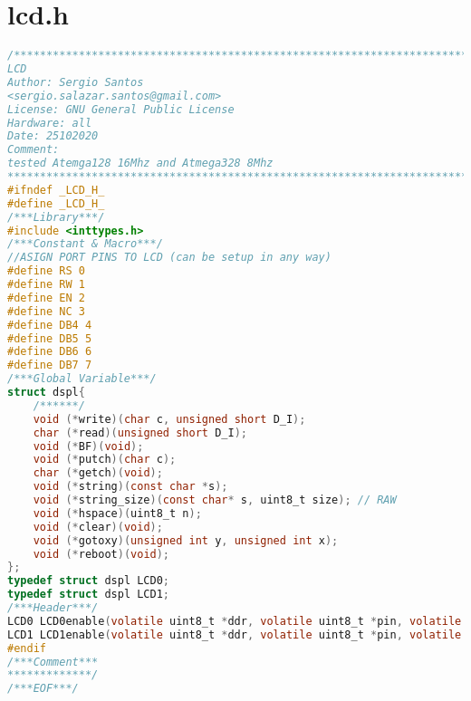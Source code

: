 \chapter{lcd.h}
\begin{lstlisting}[language=C, caption={lcd.h}, label=lcd-h, captionpos=b]
/************************************************************************
LCD
Author: Sergio Santos 
<sergio.salazar.santos@gmail.com>
License: GNU General Public License
Hardware: all
Date: 25102020
Comment:
tested Atemga128 16Mhz and Atmega328 8Mhz
************************************************************************/
#ifndef _LCD_H_
#define _LCD_H_
/***Library***/
#include <inttypes.h>
/***Constant & Macro***/
//ASIGN PORT PINS TO LCD (can be setup in any way)
#define RS 0
#define RW 1
#define EN 2
#define NC 3
#define DB4 4
#define DB5 5
#define DB6 6
#define DB7 7
/***Global Variable***/
struct dspl{
	/******/
	void (*write)(char c, unsigned short D_I);
	char (*read)(unsigned short D_I);
	void (*BF)(void);
	void (*putch)(char c);
	char (*getch)(void);
	void (*string)(const char *s);
	void (*string_size)(const char* s, uint8_t size); // RAW
	void (*hspace)(uint8_t n);
	void (*clear)(void);
	void (*gotoxy)(unsigned int y, unsigned int x);
	void (*reboot)(void);
};
typedef struct dspl LCD0;
typedef struct dspl LCD1;
/***Header***/
LCD0 LCD0enable(volatile uint8_t *ddr, volatile uint8_t *pin, volatile uint8_t *port);
LCD1 LCD1enable(volatile uint8_t *ddr, volatile uint8_t *pin, volatile uint8_t *port);
#endif
/***Comment***
*************/
/***EOF***/
\end{lstlisting}
